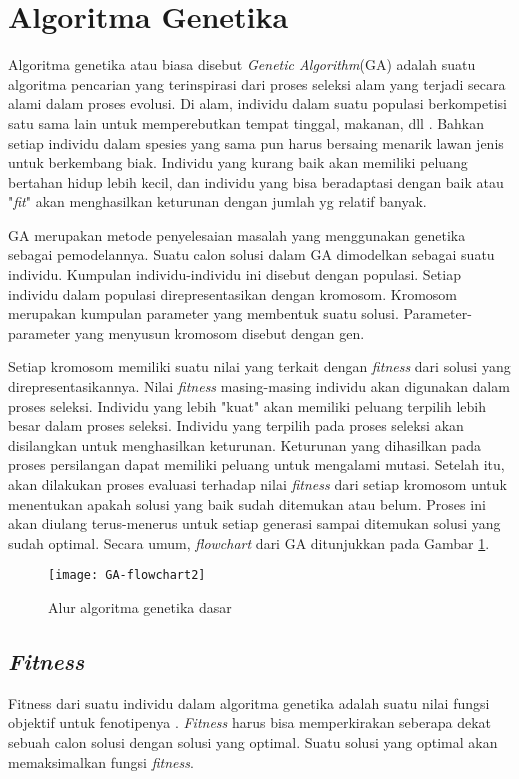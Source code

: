 \section{Algoritma Genetika}
\label{sec:GA}
Algoritma genetika atau biasa disebut \textit{Genetic Algorithm}(GA) adalah suatu algoritma pencarian yang terinspirasi dari proses seleksi alam yang terjadi secara alami dalam proses evolusi. Di alam, individu dalam suatu populasi berkompetisi satu sama lain untuk memperebutkan tempat tinggal, makanan, dll \cite{sivanandam2007introduction}. Bahkan setiap individu dalam spesies yang sama pun harus bersaing menarik lawan jenis untuk berkembang biak. Individu yang kurang baik akan memiliki peluang bertahan hidup lebih kecil, dan individu yang bisa beradaptasi dengan baik atau "\textit{fit}" akan menghasilkan keturunan dengan jumlah yg relatif banyak. 

GA merupakan metode penyelesaian masalah yang menggunakan genetika sebagai pemodelannya. Suatu calon solusi dalam GA dimodelkan sebagai suatu individu. Kumpulan individu-individu ini disebut dengan populasi. Setiap individu dalam populasi direpresentasikan dengan kromosom. Kromosom merupakan kumpulan parameter yang membentuk suatu solusi. Parameter-parameter yang menyusun kromosom disebut dengan gen. 

Setiap kromosom memiliki suatu nilai yang terkait dengan \textit{fitness} dari solusi yang direpresentasikannya. Nilai \textit{fitness} masing-masing individu akan digunakan dalam proses seleksi. Individu yang lebih "kuat" akan memiliki peluang terpilih lebih besar dalam proses seleksi. Individu yang terpilih pada proses seleksi akan disilangkan untuk menghasilkan keturunan. Keturunan yang dihasilkan pada proses persilangan dapat memiliki peluang untuk mengalami mutasi. Setelah itu, akan dilakukan proses evaluasi terhadap nilai \textit{fitness} dari setiap kromosom untuk menentukan apakah solusi yang baik sudah ditemukan atau belum. Proses ini akan diulang terus-menerus untuk setiap generasi sampai ditemukan solusi yang sudah optimal. Secara umum, \textit{flowchart} dari GA ditunjukkan pada Gambar \ref{fig:GA-flowchart}.

\begin{figure}[h]
	\centering
	\texttt{[image: GA-flowchart2]}
	\caption{Alur algoritma genetika dasar}
	\label{fig:GA-flowchart}
\end{figure}

\subsection{\textit{Fitness}}
\label{sub:fitness}
Fitness dari suatu individu dalam algoritma genetika adalah suatu nilai fungsi objektif untuk fenotipenya \cite{sivanandam2007introduction}. \textit{Fitness} harus bisa memperkirakan seberapa dekat sebuah calon solusi dengan solusi yang optimal. Suatu solusi yang optimal akan memaksimalkan fungsi \textit{fitness}. 


